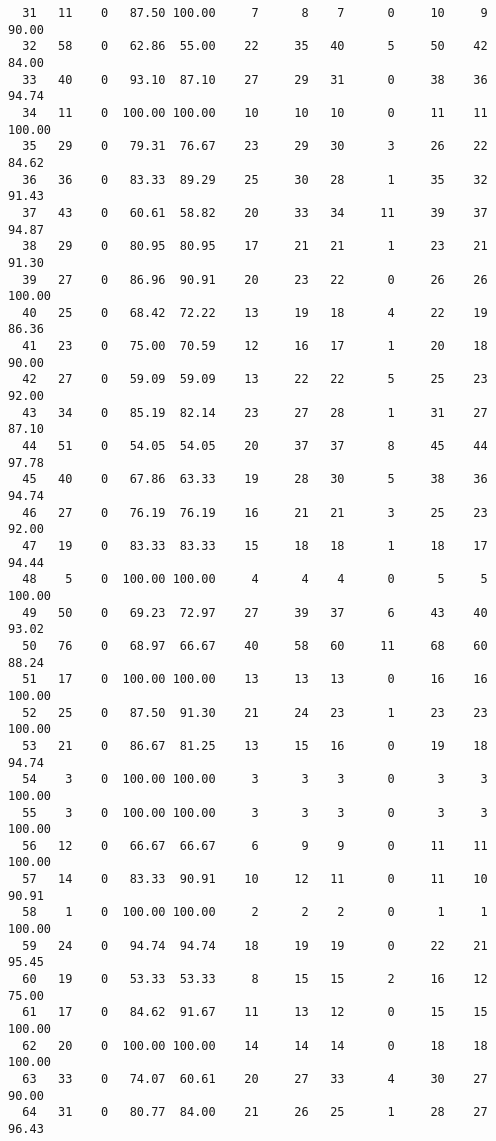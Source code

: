 \begin{verbatim}
  31   11    0   87.50 100.00     7      8    7      0     10     9    90.00
  32   58    0   62.86  55.00    22     35   40      5     50    42    84.00
  33   40    0   93.10  87.10    27     29   31      0     38    36    94.74
  34   11    0  100.00 100.00    10     10   10      0     11    11   100.00
  35   29    0   79.31  76.67    23     29   30      3     26    22    84.62
  36   36    0   83.33  89.29    25     30   28      1     35    32    91.43
  37   43    0   60.61  58.82    20     33   34     11     39    37    94.87
  38   29    0   80.95  80.95    17     21   21      1     23    21    91.30
  39   27    0   86.96  90.91    20     23   22      0     26    26   100.00
  40   25    0   68.42  72.22    13     19   18      4     22    19    86.36
  41   23    0   75.00  70.59    12     16   17      1     20    18    90.00
  42   27    0   59.09  59.09    13     22   22      5     25    23    92.00
  43   34    0   85.19  82.14    23     27   28      1     31    27    87.10
  44   51    0   54.05  54.05    20     37   37      8     45    44    97.78
  45   40    0   67.86  63.33    19     28   30      5     38    36    94.74
  46   27    0   76.19  76.19    16     21   21      3     25    23    92.00
  47   19    0   83.33  83.33    15     18   18      1     18    17    94.44
  48    5    0  100.00 100.00     4      4    4      0      5     5   100.00
  49   50    0   69.23  72.97    27     39   37      6     43    40    93.02
  50   76    0   68.97  66.67    40     58   60     11     68    60    88.24
  51   17    0  100.00 100.00    13     13   13      0     16    16   100.00
  52   25    0   87.50  91.30    21     24   23      1     23    23   100.00
  53   21    0   86.67  81.25    13     15   16      0     19    18    94.74
  54    3    0  100.00 100.00     3      3    3      0      3     3   100.00
  55    3    0  100.00 100.00     3      3    3      0      3     3   100.00
  56   12    0   66.67  66.67     6      9    9      0     11    11   100.00
  57   14    0   83.33  90.91    10     12   11      0     11    10    90.91
  58    1    0  100.00 100.00     2      2    2      0      1     1   100.00
  59   24    0   94.74  94.74    18     19   19      0     22    21    95.45
  60   19    0   53.33  53.33     8     15   15      2     16    12    75.00
  61   17    0   84.62  91.67    11     13   12      0     15    15   100.00
  62   20    0  100.00 100.00    14     14   14      0     18    18   100.00
  63   33    0   74.07  60.61    20     27   33      4     30    27    90.00
  64   31    0   80.77  84.00    21     26   25      1     28    27    96.43

\end{verbatim}
